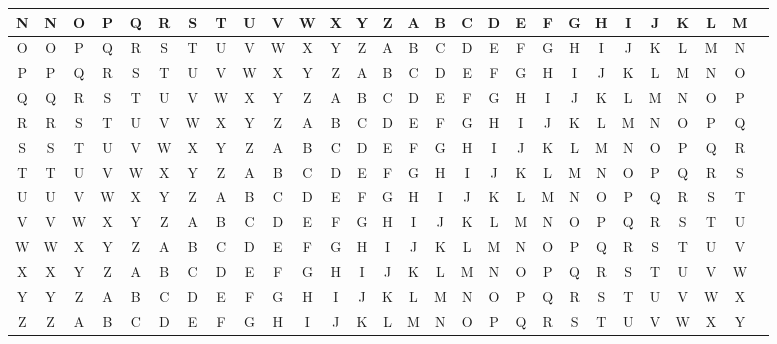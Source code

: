 \documentclass[12pt]{beamer}
\begin{document}
\begin{frame}
\begin{adjustbox}{max width=\textwidth}
\begin{tabular}{| c || c | c | c | c | c | c | c | c | c | c | c | c | c | c | c | c | c | c | c | c | c | c | c | c | c | c | c ||}
			N & N & O & P & Q & R & S & T & U & V & W & X & Y & Z & A & B & C & D & E & F & G & H & I & J & K & L & M \\ \hline
			O & O & P & Q & R & S & T & U & V & W & X & Y & Z & A & B & C & D & E & F & G & H & I & J & K & L & M & N \\ \hline
			P & P & Q & R & S & T & U & V & W & X & Y & Z & A & B & C & D & E & F & G & H & I & J & K & L & M & N & O \\ \hline
			Q & Q & R & S & T & U & V & W & X & Y & Z & A & B & C & D & E & F & G & H & I & J & K & L & M & N & O & P \\ \hline
			R & R & S & T & U & V & W & X & Y & Z & A & B & C & D & E & F & G & H & I & J & K & L & M & N & O & P & Q \\ \hline
			S & S & T & U & V & W & X & Y & Z & A & B & C & D & E & F & G & H & I & J & K & L & M & N & O & P & Q & R \\ \hline
			T & T & U & V & W & X & Y & Z & A & B & C & D & E & F & G & H & I & J & K & L & M & N & O & P & Q & R & S \\ \hline
			U & U & V & W & X & Y & Z & A & B & C & D & E & F & G & H & I & J & K & L & M & N & O & P & Q & R & S & T \\ \hline
			V & V & W & X & Y & Z & A & B & C & D & E & F & G & H & I & J & K & L & M & N & O & P & Q & R & S & T & U \\ \hline
			W & W & X & Y & Z & A & B & C & D & E & F & G & H & I & J & K & L & M & N & O & P & Q & R & S & T & U & V \\ \hline
			X & X & Y & Z & A & B & C & D & E & F & G & H & I & J & K & L & M & N & O & P & Q & R & S & T & U & V & W \\ \hline
			Y & Y & Z & A & B & C & D & E & F & G & H & I & J & K & L & M & N & O & P & Q & R & S & T & U & V & W & X \\ \hline
			Z & Z & A & B & C & D & E & F & G & H & I & J & K & L & M & N & O & P & Q & R & S & T & U & V & W & X & Y \\ \hline
		\end{tabular}
	\end{adjustbox}
\end{frame}
\end{document}
